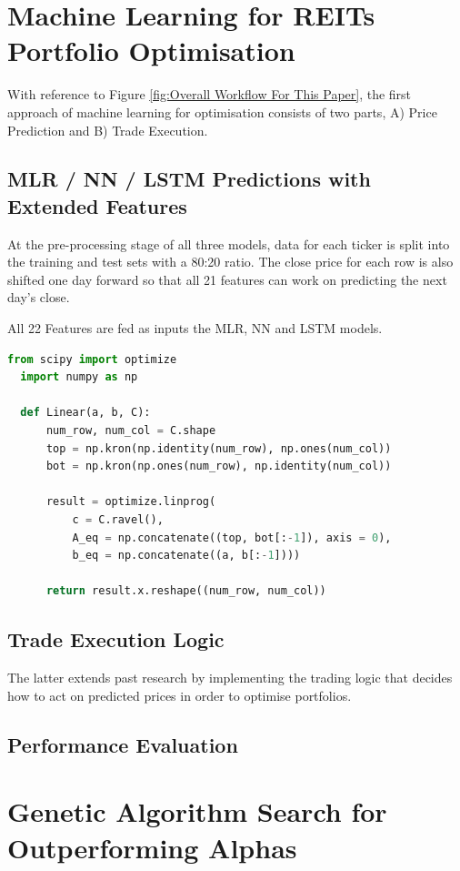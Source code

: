 \documentclass[a4paper,12pt]{report}
\numberwithin{equation}{section}
\theoremstyle{definition}
\begin{document}

\section{Machine Learning for REITs Portfolio Optimisation}
With reference to Figure \ref{fig:Overall Workflow For This Paper}, the first approach of machine learning for optimisation consists of two parts, A) Price Prediction and B) Trade Execution.


\subsection{MLR / NN / LSTM Predictions with Extended Features}
At the pre-processing stage of all three models, data for each ticker is split into the training and test sets with a 80:20 ratio. The close price for each row is also shifted one day forward so that all 21 features can work on predicting the next day's close.  


All 22 Features are fed as inputs the MLR, NN and LSTM models.
\begin{lstlisting}[language=Python, caption=Multiple Linear Regression Pseudocode]
  from scipy import optimize
  import numpy as np
  
  def Linear(a, b, C):
      num_row, num_col = C.shape
      top = np.kron(np.identity(num_row), np.ones(num_col))
      bot = np.kron(np.ones(num_row), np.identity(num_col))
  
      result = optimize.linprog(
          c = C.ravel(),
          A_eq = np.concatenate((top, bot[:-1]), axis = 0),
          b_eq = np.concatenate((a, b[:-1])))
  
      return result.x.reshape((num_row, num_col))
  \end{lstlisting}

\subsection{Trade Execution Logic}
The latter extends past research by implementing the trading logic that decides how to act on predicted prices in order to optimise portfolios. 
\subsection{Performance Evaluation}
\section{Genetic Algorithm Search for Outperforming Alphas}
\end{document}
